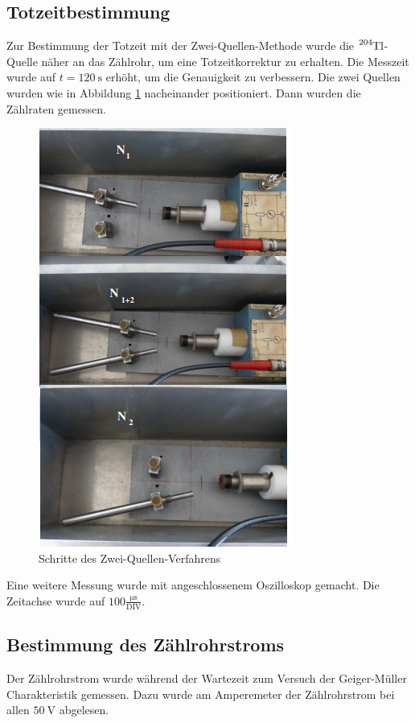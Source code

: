 \subsection{Totzeitbestimmung}
Zur Bestimmung der Totzeit mit der Zwei-Quellen-Methode wurde die $\ce{^{204}Tl}$-Quelle näher an das Zählrohr, um eine Totzeitkorrektur zu erhalten.
Die Messzeit wurde auf $t=\SI{120}{\second}$ erhöht, um die Genauigkeit zu verbessern.
Die zwei Quellen wurden wie in Abbildung \ref{fig:zqm} nacheinander positioniert. Dann wurden die Zählraten gemessen.
\begin{figure}
  \centering
  \includegraphics[scale=0.6]{pics/zqmethode.png}
  \caption{Schritte des Zwei-Quellen-Verfahrens}
  \label{fig:zqm}
\end{figure}
Eine weitere Messung wurde mit angeschlossenem Oszilloskop gemacht. Die Zeitachse wurde auf $100 \frac{\si{\micro \second}}{\text{DIV}}$.
\subsection{Bestimmung des Zählrohrstroms}
Der Zählrohrstrom wurde während der Wartezeit zum Versuch der Geiger-Müller Charakteristik gemessen.
Dazu wurde am Amperemeter der Zählrohrstrom bei allen $\SI{50}{\volt}$ abgelesen.